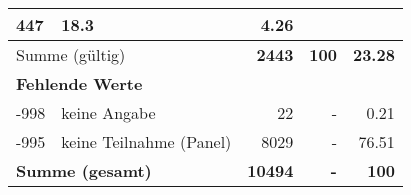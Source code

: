 \begin{longtable}{lXrrr}
       \num{447} &
       \num[round-mode=places,round-precision=2]{18,3} &
         \num[round-mode=places,round-precision=2]{4,26} \\
     \midrule
     \multicolumn{2}{l}{Summe (gültig)} &
       \textbf{\num{2443}} &
     \textbf{100} &
       \textbf{\num[round-mode=places,round-precision=2]{23,28}} \\
     \multicolumn{5}{l}{\textbf{Fehlende Werte}}\\
       -998 &
       keine Angabe &
         \num{22} &
        - &
         \num[round-mode=places,round-precision=2]{0,21} \\
       -995 &
       keine Teilnahme (Panel) &
         \num{8029} &
        - &
         \num[round-mode=places,round-precision=2]{76,51} \\
     \midrule
     \multicolumn{2}{l}{\textbf{Summe (gesamt)}} &
          \textbf{\num{10494}} &
        \textbf{-} &
        \textbf{100} \\
     \bottomrule
     \end{longtable}
     
